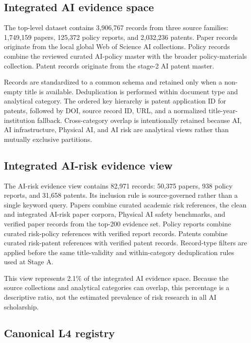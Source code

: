 \documentclass[11pt,a4paper]{article}
\begin{document}
\subsection{Integrated AI evidence space}

The top-level dataset contains 3,906,767 records from three source families:
1,749,159 papers, 125,372 policy reports, and 2,032,236 patents. Paper records
originate from the local global Web of Science AI collections. Policy records
combine the reviewed curated AI-policy master with the broader policy-materials
collection. Patent records originate from the stage-2 AI patent master.

Records are standardized to a common schema and retained only when a non-empty
title is available. Deduplication is performed within document type and
analytical category. The ordered key hierarchy is patent application ID for
patents, followed by DOI, source record ID, URL, and a normalized
title-year-institution fallback. Cross-category overlap is intentionally
retained because AI, AI infrastructure, Physical AI, and AI risk are analytical
views rather than mutually exclusive partitions.

\subsection{Integrated AI-risk evidence view}

The AI-risk evidence view contains 82,971 records: 50,375 papers, 938 policy
reports, and 31,658 patents. Its inclusion rule is source-governed rather than a
single keyword query. Papers combine curated academic risk references, the
clean and integrated AI-risk paper corpora, Physical AI safety benchmarks, and
verified paper records from the top-200 evidence set. Policy reports combine
curated risk-policy references with verified report records. Patents combine
curated risk-patent references with verified patent records. Record-type filters
are applied before the same title-validity and within-category deduplication
rules used at Stage A.

This view represents 2.1\% of the integrated AI evidence space. Because the
source collections and analytical categories can overlap, this percentage is a
descriptive ratio, not the estimated prevalence of risk research in all AI
scholarship.

\subsection{Canonical L4 registry}
\end{document}
